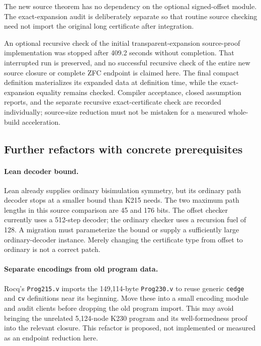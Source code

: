 \documentclass[11pt]{article}
\theoremstyle{remark}\newtheorem{remark}[theorem]{Remark}
\newcommand{\code}[1]{\texttt{\small #1}}
\begin{document}
The new source theorem has no dependency on the optional signed-offset module. The exact-expansion audit is deliberately separate so that routine source checking need not import the original long certificate after integration.

An optional recursive check of the initial transparent-expansion source-proof implementation was stopped after 409.2 seconds without completion. That interrupted run is preserved, and no successful recursive check of the entire new source closure or complete ZFC endpoint is claimed here. The final compact definition materializes its expanded data at definition time, while the exact-expansion equality remains checked. Compiler acceptance, closed assumption reports, and the separate recursive exact-certificate check are recorded individually; source-size reduction must not be mistaken for a measured whole-build acceleration.

\subsection{Further refactors with concrete prerequisites}

\paragraph{Lean decoder bound.}
Lean already supplies ordinary bisimulation symmetry, but its ordinary path decoder stops at a smaller bound than K215 needs. The two maximum path lengths in this source comparison are 45 and 176 bits. The offset checker currently uses a 512-step decoder; the ordinary checker uses a recursion fuel of 128. A migration must parameterize the bound or supply a sufficiently large ordinary-decoder instance. Merely changing the certificate type from offset to ordinary is not a correct patch.

\paragraph{Separate encodings from old program data.}
Rocq's \code{Prog215.v} imports the 149,114-byte \code{Prog230.v} to reuse generic \code{cedge} and \code{cv} definitions near its beginning. Move these into a small encoding module and audit clients before dropping the old program import. This may avoid bringing the unrelated 5,124-node K230 program and its well-formedness proof into the relevant closure. This refactor is proposed, not implemented or measured as an endpoint reduction here.
\end{document}
